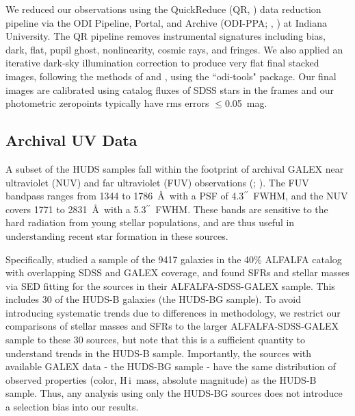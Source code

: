 \documentclass[twocolumn]{aastex6}
\def\arcsec{$^{\prime\prime}$}
\newcommand{\hi}{H{\sc\,i}}
\begin{document}
We reduced our observations using the QuickReduce
(QR, \citealp{kotulla14a}) data reduction pipeline via the ODI Pipeline,
Portal, and Archive (ODI-PPA; \citealp{gopu14a}, \citealp{young14a}) at
Indiana University. The QR pipeline removes instrumental signatures
including bias, dark, flat, pupil ghost, nonlinearity, cosmic rays,
and fringes. We also applied an iterative dark-sky illumination correction to
produce very flat final stacked images, following the methods of
\cite{janesh15a} and \cite{janowiecki15a}, using the ``odi-tools" package\footnotemark[3].
 Our final images are calibrated
using catalog fluxes of SDSS stars in the frames \citep{alam15a} and
our photometric zeropoints typically have rms errors $\le$0.05~mag.


\subsection{Archival UV Data}
\label{data.uv}

A subset of the HUDS samples fall within the footprint 
of archival GALEX near ultraviolet (NUV) and far ultraviolet (FUV) observations (\citealp{martin05a}; \citealp{morrissey07a}). The FUV bandpass ranges from 1344 to 1786~\AA\ with a PSF of 4.3\arcsec\ FWHM, and the NUV covers 1771 to 2831~\AA\ with a 5.3\arcsec\ FWHM. These bands are sensitive to the hard radiation from young stellar populations, and are thus useful in understanding recent star formation in these sources. 

Specifically, \cite{huang12b} studied a sample of the 9417 galaxies in the 40\% ALFALFA catalog with overlapping SDSS and GALEX coverage, and found SFRs and stellar masses via SED fitting for the sources in their ALFALFA-SDSS-GALEX sample. This includes 30 of the HUDS-B galaxies (the HUDS-BG sample). To avoid introducing systematic trends due to differences in methodology, we restrict our comparisons of stellar masses and SFRs to the larger ALFALFA-SDSS-GALEX sample to these 30 sources, but note that this is a sufficient quantity to understand trends in the HUDS-B sample. Importantly, the sources with available GALEX data - the HUDS-BG sample - 
have the same distribution of observed properties (color, \hi\ mass, absolute magnitude) as the HUDS-B sample. 
Thus, any analysis using only the HUDS-BG sources does not introduce a selection bias into our results.
\end{document}
